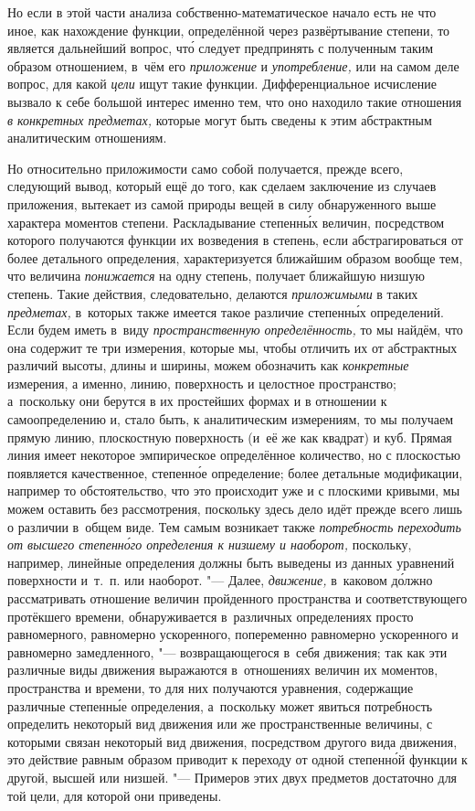 Но если в этой части анализа собственно-математическое начало есть не что иное,
как нахождение функции, определённой через развёртывание степени, то является
дальнейший вопрос, чт\'{о} следует предпринять с полученным таким образом
отношением, в~чём его {\em приложение} и {\em употребление,} или на самом деле
вопрос, для какой {\em цели} ищут такие функции. Дифференциальное исчисление
вызвало к себе большой интерес именно тем, что оно находило такие отношения
{\em в конкретных предметах,} которые могут быть сведены к этим абстрактным
аналитическим отношениям.

Но относительно приложимости само собой получается, прежде всего, следующий
вывод, который ещё до того, как сделаем заключение из случаев приложения,
вытекает из самой природы вещей в силу обнаруженного выше характера моментов
степени. Раскладывание степенн\'{ы}х величин, посредством которого получаются
функции их возведения в степень, если абстрагироваться от более детального
определения, характеризуется ближайшим образом вообще тем, что величина
{\em понижается} на одну степень, получает ближайшую низшую степень. Такие
действия, следовательно, делаются {\em приложимыми} в таких {\em предметах,}
в~которых также имеется такое различие степенн\'{ы}х определений. Если будем
иметь в~виду {\em пространственную определённость,} то мы найдём, что она
содержит те три измерения, которые мы, чтобы отличить их от абстрактных
различий высоты, длины и ширины, можем обозначить как {\em конкретные}
измерения, а именно, линию, поверхность и целостное пространство; а~поскольку
они берутся в их простейших формах и в отношении к самоопределению и, стало
быть, к аналитическим измерениям, то мы получаем прямую линию, плоскостную
поверхность (и~её же как квадрат) и куб. Прямая линия имеет некоторое
эмпирическое определённое количество, но с плоскостью появляется качественное,
степенн\'{о}е определение; более детальные модификации, например то
обстоятельство, что это происходит уже и с плоскими кривыми, мы можем оставить
без рассмотрения, поскольку здесь дело идёт прежде всего лишь о различии
в~общем виде. Тем самым возникает также {\em потребность переходить от высшего
степенн\'{о}го определения к низшему и наоборот,} поскольку, например, линейные
определения должны быть выведены из данных уравнений поверхности и~т.~п. или
наоборот. "--- Далее, {\em движение,} в~каковом д\'{о}лжно рассматривать отношение
величин пройденного пространства и соответствующего протёкшего времени,
обнаруживается в~различных определениях просто равномерного, равномерно
ускоренного, попеременно равномерно ускоренного и равномерно замедленного, "---
возвращающегося в~себя движения; так как эти различные виды движения выражаются
в~отношениях величин их моментов, пространства и времени, то для них получаются
уравнения, содержащие различные степенн\'{ы}е определения, а~поскольку может
явиться потребность определить некоторый вид движения или же пространственные
величины, с которыми связан некоторый вид движения, посредством другого вида
движения, это действие равным образом приводит к переходу от одной
степенн\'{о}й функции к другой, высшей или низшей. "--- Примеров этих двух
предметов достаточно для той цели, для которой они приведены.

